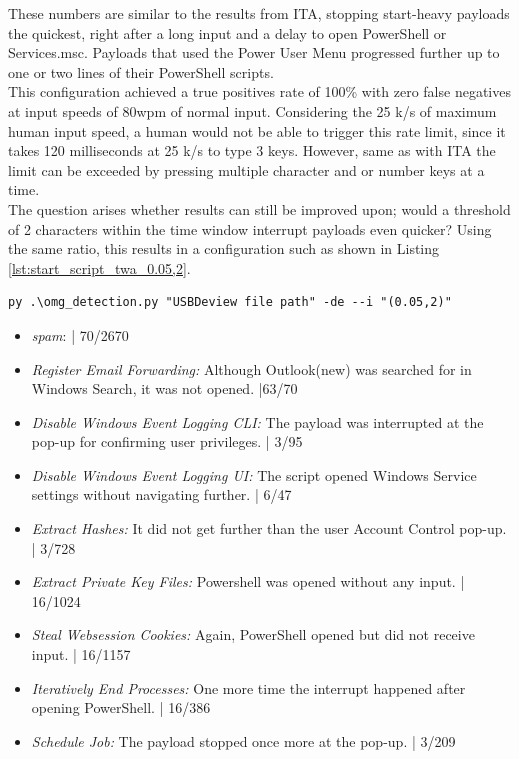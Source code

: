 These numbers are similar to the results from ITA, stopping start-heavy payloads the quickest, right after a long input and a delay to open PowerShell or Services.msc. Payloads that used the Power User Menu progressed further up to one or two lines of their PowerShell scripts. \\
This configuration achieved a true positives rate of 100\% with zero false negatives at input speeds of 80wpm of normal input. Considering the 25 k/s of maximum human input speed, a human would not be able to trigger this rate limit, since it takes 120 milliseconds at 25 k/s to type 3 keys. However, same as with ITA the limit can be exceeded by pressing multiple character and or number keys at a time. \\
The question arises whether results can still be improved upon; would a threshold of 2 characters within the time window interrupt payloads even quicker? Using the same ratio, this results in a configuration such as shown in Listing \ref{lst:start_script_twa_0.05,2}. 


\begin{lstlisting}[caption={start defence Script with TWA (0.05,2)},label={lst:start_script_twa_0.05,2}, captionpos=b]
 py .\omg_detection.py "USBDeview file path" -de --i "(0.05,2)"
\end{lstlisting}

\begin{itemize}
    \item  \emph{spam}:  | 70/2670
    \item  \emph{Register Email Forwarding:} Although Outlook(new) was searched for in Windows Search, it was not opened.  |63/70 
    \item  \emph{Disable Windows Event Logging CLI:} The payload was interrupted at the pop-up for confirming user privileges. | 3/95
    \item  \emph{Disable Windows Event Logging UI:} The script opened Windows Service settings without navigating further.  | 6/47
    \item  \emph{Extract Hashes:} It did not get further than the user Account Control pop-up. | 3/728 
    \item  \emph{Extract Private Key Files:} Powershell was opened without any input. | 16/1024
    \item  \emph{Steal Websession Cookies:} Again, PowerShell opened but did not receive input. | 16/1157
    \item  \emph{Iteratively End Processes:} One more time the interrupt happened after opening PowerShell.  | 16/386
    \item  \emph{Schedule Job:}  The payload stopped once more at the pop-up. | 3/209
\end{itemize}

